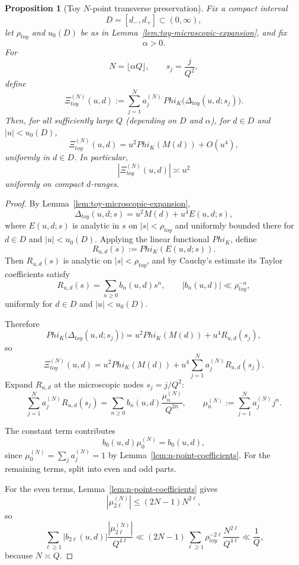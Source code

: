 \documentclass[11pt,a4paper]{amsart}
\def\Phi{Phi}%
\def\toy{toy}%
\theoremstyle{plain}
\newtheorem{proposition}[theorem]{Proposition}
\theoremstyle{definition}
\newcommand{\toy}{\mathrm{toy}}
\begin{document}
\begin{proposition}[Toy $N$-point transverse preservation]
\label{prop:toy-n-point-direct}
Fix a compact interval
\[
D=[d_-,d_+]\subset(0,\infty),
\]
let $\rho_{\toy}$ and $u_0(D)$ be as in
Lemma~\ref{lem:toy-microscopic-expansion}, and fix
\[
\alpha>0.
\]
For
\[
N=\lfloor \alpha Q\rfloor,
\qquad
s_j=\frac{j}{Q^2},
\]
define
\[
\Xi_{\toy}^{(N)}(u,d)
:=
\sum_{j=1}^N a_j^{(N)}\,
\Phi_K\!\bigl(\Delta_{\toy}(u,d;s_j)\bigr).
\]
Then, for all sufficiently large $Q$ (depending on $D$ and $\alpha$),
for $d\in D$ and $|u|<u_0(D)$,
\[
\Xi_{\toy}^{(N)}(u,d)
=
u^2\Phi_K(M(d))+O(u^4),
\]
uniformly in $d\in D$. In particular,
\[
|\Xi_{\toy}^{(N)}(u,d)|\asymp u^2
\]
uniformly on compact $d$-ranges.
\end{proposition}

\begin{proof}
By Lemma~\ref{lem:toy-microscopic-expansion},
\[
\Delta_{\toy}(u,d;s)=u^2M(d)+u^4E(u,d;s),
\]
where $E(u,d;s)$ is analytic in $s$ on $|s|<\rho_{\toy}$ and uniformly
bounded there for $d\in D$ and $|u|<u_0(D)$. Applying the linear
functional $\Phi_K$, define
\[
R_{u,d}(s):=\Phi_K(E(u,d;s)).
\]
Then $R_{u,d}(s)$ is analytic on $|s|<\rho_{\toy}$, and by Cauchy's
estimate its Taylor coefficients satisfy
\[
R_{u,d}(s)=\sum_{n\ge 0} b_n(u,d)s^n,
\qquad
|b_n(u,d)|\ll \rho_{\toy}^{-n},
\]
uniformly for $d\in D$ and $|u|<u_0(D)$.

Therefore
\[
\Phi_K\!\bigl(\Delta_{\toy}(u,d;s_j)\bigr)
=
u^2\Phi_K(M(d))+u^4R_{u,d}(s_j),
\]
so
\[
\Xi_{\toy}^{(N)}(u,d)
=
u^2\Phi_K(M(d))
+
u^4\sum_{j=1}^N a_j^{(N)}R_{u,d}(s_j).
\]
Expand $R_{u,d}$ at the microscopic nodes $s_j=j/Q^2$:
\[
\sum_{j=1}^N a_j^{(N)}R_{u,d}(s_j)
=
\sum_{n\ge 0} b_n(u,d)\frac{\mu_n^{(N)}}{Q^{2n}},
\qquad
\mu_n^{(N)}:=\sum_{j=1}^N a_j^{(N)}j^n.
\]

The constant term contributes
\[
b_0(u,d)\mu_0^{(N)}=b_0(u,d),
\]
since $\mu_0^{(N)}=\sum_j a_j^{(N)}=1$ by
Lemma~\ref{lem:n-point-coefficients}. For the remaining terms, split into
even and odd parts.

For the even terms, Lemma~\ref{lem:n-point-coefficients} gives
\[
|\mu_{2\ell}^{(N)}|
\le
(2N-1)N^{2\ell},
\]
so
\[
\sum_{\ell\ge 1}
|b_{2\ell}(u,d)|\frac{|\mu_{2\ell}^{(N)}|}{Q^{4\ell}}
\ll
(2N-1)\sum_{\ell\ge 1}
\rho_{\toy}^{-2\ell}\frac{N^{2\ell}}{Q^{4\ell}}
\ll
\frac{1}{Q},
\]
because $N\asymp Q$.


\end{proof}
\end{document}
